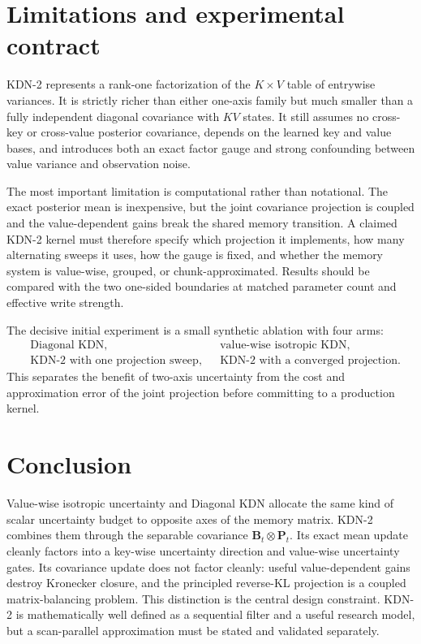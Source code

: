 \documentclass[11pt]{article}
\newcommand{\ve}[1]{\boldsymbol{#1}}
\begin{document}
\section{Limitations and experimental contract}
\label{sec:limitations}

KDN-2 represents a rank-one factorization of the $K\times V$ table of entrywise variances.  It is
strictly richer than either one-axis family but much smaller than a fully independent diagonal
covariance with $KV$ states.  It still assumes no cross-key or cross-value posterior covariance,
depends on the learned key and value bases, and introduces both an exact factor gauge and strong
confounding between value variance and observation noise.

The most important limitation is computational rather than notational.  The exact posterior mean
is inexpensive, but the joint covariance projection is coupled and the value-dependent gains
break the shared memory transition.  A claimed KDN-2 kernel must therefore specify which
projection it implements, how many alternating sweeps it uses, how the gauge is fixed, and whether
the memory system is value-wise, grouped, or chunk-approximated.  Results should be compared with
the two one-sided boundaries at matched parameter count and effective write strength.

The decisive initial experiment is a small synthetic ablation with four arms:
\begin{equation}
\begin{aligned}
  &\text{Diagonal KDN},
  &&\text{value-wise isotropic KDN},\\
  &\text{KDN-2 with one projection sweep},
  &&\text{KDN-2 with a converged projection}.
\end{aligned}
  \label{eq:kdn2-initial-ablation}
\end{equation}
This separates the benefit of two-axis uncertainty from the cost and approximation error of the
joint projection before committing to a production kernel.

\section{Conclusion}

Value-wise isotropic uncertainty and Diagonal KDN allocate the same kind of scalar uncertainty
budget to opposite axes of the memory matrix.  KDN-2 combines them through the separable
covariance $\ve{B}_t\otimes\ve{P}_t$.  Its exact mean update cleanly factors into a key-wise
uncertainty direction and value-wise uncertainty gates.  Its covariance update does not factor
cleanly: useful value-dependent gains destroy Kronecker closure, and the principled reverse-KL
projection is a coupled matrix-balancing problem.  This distinction is the central design
constraint.  KDN-2 is mathematically well defined as a sequential filter and a useful research
model, but a scan-parallel approximation must be stated and validated separately.
\end{document}

